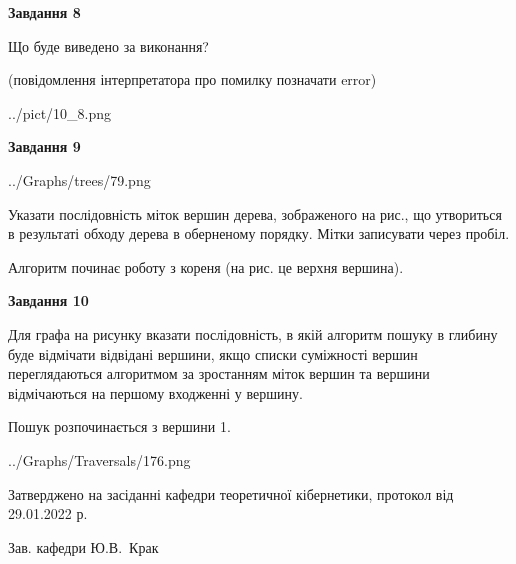 \documentclass[12pt, ukrainian]{article}
\begin{document}
{\begin {large}
{\begin {center}\textbf{Завдання 8}\end {center}}\par
Що буде виведено за виконання?\par
 (повідомлення інтерпретатора про помилку позначати error)\par
\begin{center}
	{../pict/10_8.png}
\end{center}
\newpage

{\begin {center}\textbf{Завдання 9}\end {center}}\par

\begin{center}
	{../Graphs/trees/79.png}
\end{center}
Указати послідовність міток вершин дерева, зображеного на рис., що утвориться в результаті обходу дерева в оберненому порядку. Мітки записувати через пробіл.\par Алгоритм починає роботу з кореня (на рис. це верхня вершина).\par
\newpage

{\begin {center}\textbf{Завдання 10}\end {center}}\par
Для графа на рисунку вказати послідовність, в якій алгоритм пошуку в глибину буде відмічати відвідані вершини, якщо списки суміжності вершин переглядаються алгоритмом за зростанням міток вершин та вершини відмічаються на першому вход\-женні у вершину.\par
Пошук розпочинається з вершини 1.\par

\begin{center}
	{../Graphs/Traversals/176.png}
\end{center}\par
\newpage


\end {large}
}
{\smallskip \begin {small} Затверджено на засіданні кафедри теоретичної кібернетики, протокол  від   29.01.2022 р.\par\smallskip\smallskip
{\parbox {6.5 cm}{Зав. кафедри \dotfill Ю.В.~Крак}} \end{small}}
\end{document}
